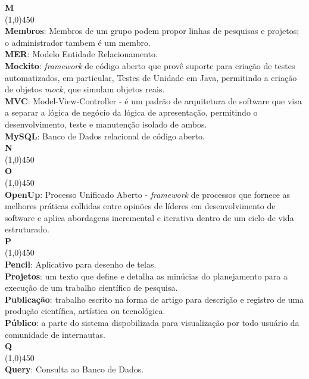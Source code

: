\documentclass[11pt, a4paper]{article}
\begin{document}
	\noindent\textbf{\huge{M}}\\
	\line(1,0){450}\\
	\textbf{Membros}: Membros de um grupo podem propor linhas de pesquisas e projetos; 
	o administrador tambem é um membro.\\
	\textbf{MER}: Modelo Entidade Relacionamento.\\
	\textbf{Mockito}: \emph{framework} de código aberto que provê suporte para criação de testes automatizados, em particular, Testes de Unidade em Java, permitindo a criação de objetos \emph{mock}, que simulam objetos reais.\\
	\textbf{MVC}: Model-View-Controller - é um padrão de arquitetura de software
	que visa a separar a lógica de negócio da lógica de apresentação, permitindo
	o desenvolvimento, teste e manutenção isolado de ambos.\\
	\textbf{MySQL}: Banco de Dados relacional de código aberto.\\
			
	\noindent\textbf{\huge{N}}\\
	\line(1,0){450}\\
	
	\noindent\textbf{\huge{O}}\\
	\line(1,0){450}\\
	\textbf{OpenUp}: Processo Unificado Aberto - \emph{framework} de processos que fornece as melhores práticas colhidas entre opinões de líderes em desenvolvimento de software e aplica abordagens incremental e iterativa dentro de um ciclo de vida estruturado.\\
	
	\noindent\textbf{\huge{P}}\\
	\line(1,0){450}\\
	\textbf{Pencil}: Aplicativo para desenho de telas.\\
	\textbf{Projetos}: um texto que define e detalha as minúcias do planejamento para a execução de um trabalho científico de pesquisa.\\
	\textbf{Publicação}: trabalho escrito na forma de artigo para descrição e registro de uma produção científica, artística ou tecnológica.\\
	\textbf{Público}: a parte do sistema dispobilizada para visualização por todo usuário da comunidade de internautas.\\
	
	\noindent\textbf{\huge{Q}}\\
	\line(1,0){450}\\
	\textbf{Query}: Consulta ao Banco de Dados.\\
	
\end{document}
